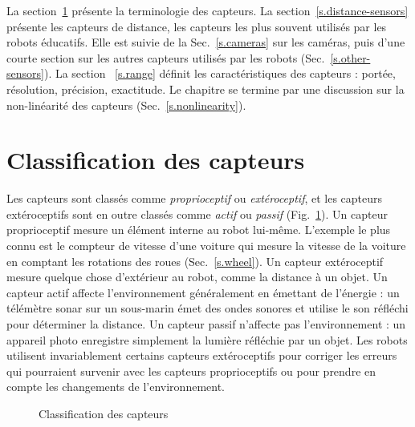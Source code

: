 La section~\ref{s.classify} présente la terminologie des capteurs. La section~\ref{s.distance-sensors} présente les capteurs de distance, les capteurs les plus souvent utilisés par les robots éducatifs. Elle est suivie de la Sec.~\ref{s.cameras} sur les caméras, puis d'une courte section sur les autres capteurs utilisés par les robots (Sec.~\ref{s.other-sensors}). La section ~\ref{s.range} définit les caractéristiques des capteurs : portée, résolution, précision, exactitude. Le chapitre se termine par une discussion sur la non-linéarité des capteurs (Sec.~\ref{s.nonlinearity}).


\section{Classification des capteurs}\label{s.classify}

Les capteurs sont classés comme \emph{proprioceptif} ou \emph{extéroceptif}, et les capteurs extéroceptifs sont en outre classés comme \emph{actif} ou \emph{passif} (Fig.~\ref{fig.sensor-classification}). Un capteur proprioceptif mesure un élément interne au robot lui-même. L'exemple le plus connu est le compteur de vitesse d'une voiture qui mesure la vitesse de la voiture en comptant les rotations des roues (Sec.~\ref{s.wheel}). Un capteur extéroceptif mesure quelque chose d'extérieur au robot, comme la distance à un objet. Un capteur actif affecte l'environnement généralement en émettant de l'énergie : un télémètre sonar sur un sous-marin émet des ondes sonores et utilise le son réfléchi pour déterminer la distance. Un capteur passif n'affecte pas l'environnement : un appareil photo enregistre simplement la lumière réfléchie par un objet. Les robots utilisent invariablement certains capteurs extéroceptifs pour corriger les erreurs qui pourraient survenir avec les capteurs proprioceptifs ou pour prendre en compte les changements de l'environnement.

\begin{figure}
\begin{center}
\caption{Classification des capteurs}\label{fig.sensor-classification}
\end{center}
\end{figure}

